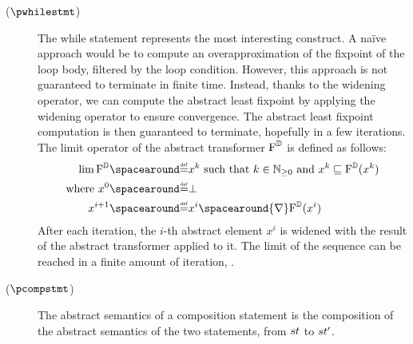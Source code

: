 \begin{description}
  \item[\normalfont ($\pwhilestmt$)] The while statement represents the most interesting construct.
  A na\"ive approach would be to compute an overapproximation of the fixpoint of the loop body, filtered by the loop condition.
  However, this approach is not guaranteed to terminate in finite time. Instead, thanks to the widening operator, we can compute the abstract least fixpoint by applying the widening operator to ensure convergence. The abstract least fixpoint computation is then guaranteed to terminate, hopefully in a few iterations.
  The limit operator of the abstract transformer $\textup{F}^{\mathbb{D}}$ is defined as follows:
  \begin{align*}
    \lim \abstractdomaintransformer &\DefeQ x^k \text{ such that } k\in\Npos \text{ and } x^k \abstractdomainsubseteq \abstractdomaintransformer(x^k) \\
    \text{where } x^0 &\DefeQ \abstractdomainbottom \\
    x^{i+1} &\DefeQ x^i \spacearound{\abstractdomainwidening} \abstractdomaintransformer(x^i)
  \end{align*}
  After each iteration, the $i$-th abstract element $x^i$ is widened with the result of the abstract transformer applied to it. The limit of the sequence can be reached in a finite amount of iteration, \cf{} .
  \item[\normalfont ($\pcompstmt$)] The abstract semantics of a composition statement is the composition of the abstract semantics of the two statements, from $st$ to $st'$.

\end{description}

